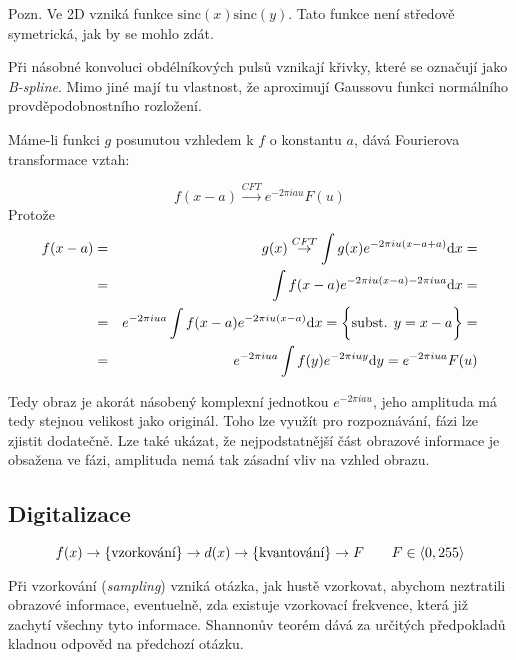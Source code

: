 Pozn. Ve 2D vzniká funkce $\mathrm{sinc}(x)\mathrm{sinc}(y)$. Tato funkce není středově symetrická, jak by se mohlo zdát.


Při násobné konvoluci obdélníkových pulsů vznikají křivky, které se označují jako {\em B-spline}. Mimo jiné mají tu
vlastnost, že aproximují Gaussovu funkci normálního provděpodobnostního rozložení.


  Máme-li funkci $g$ posunutou vzhledem k $f$ o konstantu $a$, dává Fourierova transformace vztah:

\begin{equation}
f(x-a)\stackrel{CFT}{\rightarrow} e^{-2\pi i a u} F(u)
\end{equation}
Protože
\begin{eqnarray}
f(x-a)&=&g(x)\stackrel{CFT}{\rightarrow}\int g(x)e^{-2\pi i u (x-a+a)}{\rm d} x=\nonumber\\
&=&\int f(x-a)e^{-2\pi i u (x-a)-2\pi i u a}{\rm d} x=\nonumber\\
&=&e^{-2\pi i u a}\int f(x-a)e^{-2\pi i u (x-a)}{\rm d} x=\bigg\{\hbox{subst. $y=x-a$}\bigg\}=\nonumber\\
&=&e^{-2\pi i u a}\int f(y)e^{-2\pi i u y}{\rm d} y=e^{-2\pi i u a}F(u)
\end{eqnarray}


Tedy obraz je akorát násobený komplexní jednotkou $e^{-2\pi iau}$, jeho amplituda má tedy stejnou velikost jako originál.
Toho lze využít pro rozpoznávání, fázi lze zjistit dodatečně. Lze také ukázat, že nejpodstatnější část obrazové informace
je obsažena ve fázi, amplituda nemá tak zásadní vliv na vzhled obrazu.

\subsection{Digitalizace}

\begin{equation}
f(x)\rightarrow \{\hbox{vzorkování}\}\rightarrow d(x) \rightarrow \{\hbox{kvantování}\} \rightarrow F\qquad F\in\langle0,255\rangle
\end{equation}

Při vzorkování ({\em sampling}) vzniká otázka, jak hustě vzorkovat, abychom neztratili obrazové informace, 
eventuelně, zda existuje vzorkovací frekvence, která již zachytí všechny tyto informace. Shannonův teorém dává za určitých
předpokladů kladnou odpověd na předchozí otázku. 

